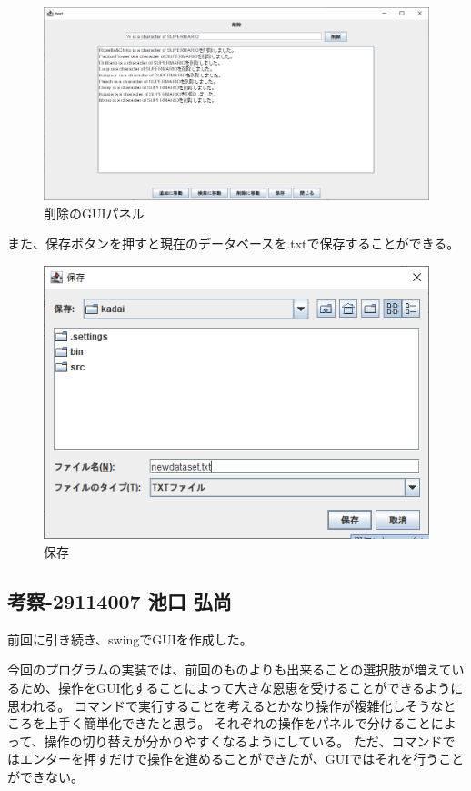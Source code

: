 \documentclass{jarticle}
\begin{document}
\begin{figure}[!hbt]
  \centering
  \includegraphics[bb=0 0 986 493,width=1.2\linewidth]{pic5.png}
  \caption{削除のGUIパネル}
  \label{fig:pic5}
\end{figure}

また、保存ボタンを押すと現在のデータベースを.txtで保存することができる。
\begin{figure}[!hbt]
  \centering
  \includegraphics[bb=0 0 505 358,width=1\linewidth]{pic7.png}
  \caption{保存}
  \label{fig:pic7}
\end{figure}

\subsection{考察-29114007 池口 弘尚}
前回に引き続き、swingでGUIを作成した。

今回のプログラムの実装では、前回のものよりも出来ることの選択肢が増えているため、操作をGUI化することによって大きな恩恵を受けることができるように思われる。
コマンドで実行することを考えるとかなり操作が複雑化しそうなところを上手く簡単化できたと思う。
それぞれの操作をパネルで分けることによって、操作の切り替えが分かりやすくなるようにしている。
ただ、コマンドではエンターを押すだけで操作を進めることができたが、GUIではそれを行うことができない。
\end{document}
